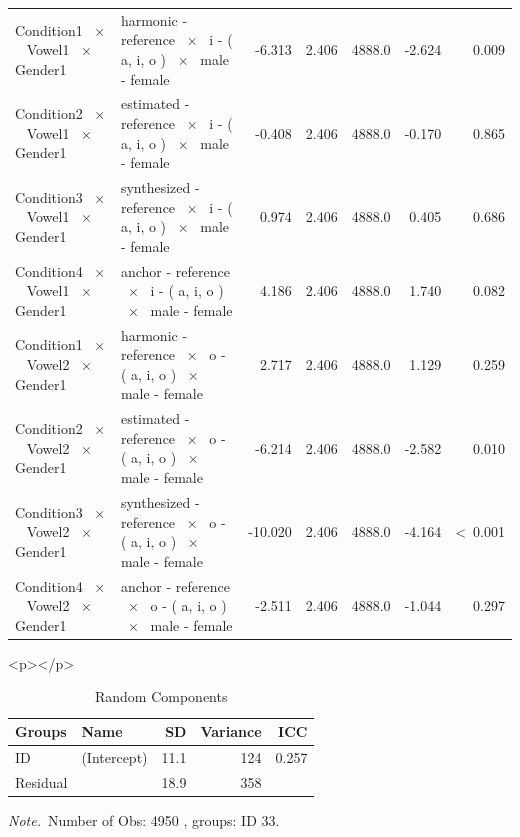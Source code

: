 \documentclass[a4paper,man,hidelinks,floatsintext]{apa7}
\begin{document}
\begin{table}[!htbp]
\begin{adjustbox}{max size={\columnwidth}{\textheight}}
\begin{tabular}{llrrrrr}
Condition1 ~$\times$~ Vowel1 ~$\times$~ Gender1 & harmonic - reference ~$\times$~ i - ( a, i, o ) ~$\times$~ male - female    &   -6.313 & 2.406 & 4888.0 &  -2.624 &           0.009 \\
Condition2 ~$\times$~ Vowel1 ~$\times$~ Gender1 & estimated - reference ~$\times$~ i - ( a, i, o ) ~$\times$~ male - female   &   -0.408 & 2.406 & 4888.0 &  -0.170 &           0.865 \\
Condition3 ~$\times$~ Vowel1 ~$\times$~ Gender1 & synthesized - reference ~$\times$~ i - ( a, i, o ) ~$\times$~ male - female &    0.974 & 2.406 & 4888.0 &   0.405 &           0.686 \\
Condition4 ~$\times$~ Vowel1 ~$\times$~ Gender1 & anchor - reference ~$\times$~ i - ( a, i, o ) ~$\times$~ male - female      &    4.186 & 2.406 & 4888.0 &   1.740 &           0.082 \\
Condition1 ~$\times$~ Vowel2 ~$\times$~ Gender1 & harmonic - reference ~$\times$~ o - ( a, i, o ) ~$\times$~ male - female    &    2.717 & 2.406 & 4888.0 &   1.129 &           0.259 \\
Condition2 ~$\times$~ Vowel2 ~$\times$~ Gender1 & estimated - reference ~$\times$~ o - ( a, i, o ) ~$\times$~ male - female   &   -6.214 & 2.406 & 4888.0 &  -2.582 &           0.010 \\
Condition3 ~$\times$~ Vowel2 ~$\times$~ Gender1 & synthesized - reference ~$\times$~ o - ( a, i, o ) ~$\times$~ male - female &  -10.020 & 2.406 & 4888.0 &  -4.164 & \textless~0.001 \\
Condition4 ~$\times$~ Vowel2 ~$\times$~ Gender1 & anchor - reference ~$\times$~ o - ( a, i, o ) ~$\times$~ male - female      &   -2.511 & 2.406 & 4888.0 &  -1.044 &           0.297 \\
\hline
\end{tabular}
\end{adjustbox}
\begin{tablenotes} {
\small
}
\end{tablenotes}
\end{table}
      
        <p></p>
      
    
\begin{table}[!htbp]
\caption{Random Components}
\label{tab:Table_4}
\begin{adjustbox}{max size={\columnwidth}{\textheight}}
\centering
\begin{tabular}{llrrr}
\hline
Groups   & Name        &   SD & Variance &   ICC \\
\hline
ID       & (Intercept) & 11.1 &      124 & 0.257 \\
Residual & ~           & 18.9 &      358 &     ~ \\
\hline
\end{tabular}
\end{adjustbox}
\begin{tablenotes} {
\small
\textit{Note.}~Number of Obs: 4950 , groups: ID 33. \\
}
\end{tablenotes}
\end{table}
      
\end{document}
